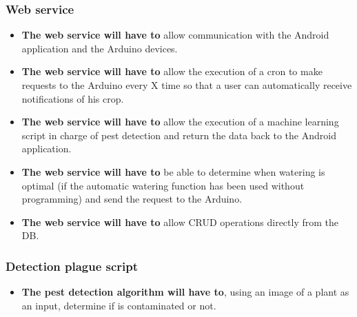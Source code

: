 \documentclass[11pt,a4paper]{article}
\begin{document}
\subsubsection{Web service}
\begin{itemize}
\item \textbf{The web service will have to} allow communication with the Android application and the Arduino devices.

\item \textbf{The web service will have to} allow the execution of a cron to make requests to the Arduino every X time so that a user can automatically receive notifications of his crop.

\item \textbf{The web service will have to} allow the execution of a machine learning script in charge of pest detection and return the data back to the Android application.

\item \textbf{The web service will have to} be able to determine when watering is optimal (if the automatic watering function has been used without programming) and send the request to the Arduino.

\item \textbf{The web service will have to} allow CRUD operations directly from the DB.
\end{itemize}

\subsubsection{Detection plague script}
\begin{itemize}

\item \textbf{The pest detection algorithm will have to}, using an image of a plant as an input, determine if is contaminated or not.

\end{itemize}
\end{document}
